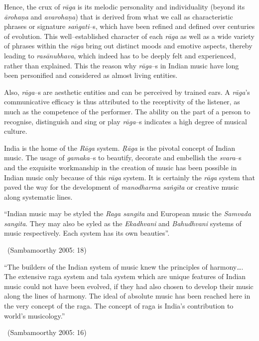 Hence, the crux of \textit{rāga} is its melodic personality and individuality (beyond its \textit{ārohaṇa} and \textit{avarohaṇa}) that is derived from what we call as characteristic phrases or signature \textit{saṅgati}–s, which have been refined and defined over centuries of evolution. This well–established character of each \textit{rāga} as well as a wide variety of phrases within the \textit{rāga} bring out distinct moods and emotive aspects, thereby leading to \textit{rasānubhava}, which indeed has to be deeply felt and experienced, rather than explained. This the reason why \textit{rāga}–s in Indian music have long been personified and considered as almost living entities. 

Also, \textit{rāga}–s are aesthetic entities and can be perceived by trained ears. A \textit{rāga}’s communicative efficacy is thus attributed to the receptivity of the listener, as much as the competence of the performer. The ability on the part of a person to recognise, distinguish and sing or play \textit{rāga}–s indicates a high degree of musical culture.

India is the home of the \textit{Rāga} system. \textit{Ṛāga} is the pivotal concept of Indian music. The usage of \textit{gamaka}–s to beautify, decorate and embellish the \textit{svara}–s and the exquisite workmanship in the creation of music has been possible in Indian music only because of this \textit{rāga} system. It is certainly the \textit{rāga} system that paved the way for the development of \textit{manodharma saṅgīta} or creative music along systematic lines.

\begin{myquote}
“Indian music may be styled the \textit{Raga sangita} and European music the \textit{Samvada sangita}. They may also be syled as the \textit{Ekadhvani} and \textit{Bahudhvani} systems of music respectively. Each system has its own beauties”. 

~\hfill (Sambamoorthy 2005: 18)
\end{myquote}

\begin{myquote}
“The builders of the Indian system of music knew the principles of harmony…. The extensive raga system and tala system which are unique features of Indian music could not have been evolved, if they had also chosen to develop their music along the lines of harmony. The ideal of absolute music has been reached here in the very concept of the raga. The concept of raga is India’s contribution to world’s musicology.” 

~\hfill (Sambamoorthy 2005: 16)
\end{myquote}

